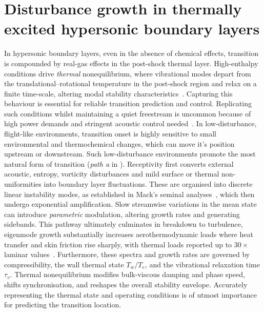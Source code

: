 \chapter{Disturbance growth in thermally excited hypersonic boundary layers}\label{chapter:disturbance_growth}

In hypersonic boundary layers, even in the absence of chemical effects,  transition is compounded by real-gas effects in the post-shock thermal layer. High-enthalpy conditions drive \emph{thermal} nonequilibrium, where vibrational modes depart from the translational--rotational temperature in the post-shock region and relax on a finite time-scale, altering modal stability characteristics~\citep{Candler2019}. Capturing this behaviour is essential for reliable transition prediction and control. Replicating such conditions whilst maintaining a quiet freestream is uncommon because of high power demands and stringent acoustic control needed~\citep{DiRenzo2021}. In low-disturbance, flight-like environments, transition onset is highly sensitive to small environmental and thermochemical changes, which can move it's position upstream or downstream. Such low-disturbance environments promote the most natural form of transition (\textit{path a} in ). Receptivity first converts external acoustic, entropy, vorticity disturbances and mild surface or thermal non-uniformities into boundary layer fluctuations. These are organised into discrete linear instability modes, as established in Mack's seminal analyses~\citep{Mack1984}, which then undergo exponential amplification. Slow streamwise variations in the mean state can introduce \emph{parametric} modulation, altering growth rates and generating sidebands. This pathway ultimately culminates in breakdown to turbulence, eigenmode growth substantially increases aerothermodynamic loads where heat transfer and skin friction rise sharply, with thermal loads reported up to $30\times$ laminar values~\citep{BitterShepherd2015}. Furthermore, these spectra and growth rates are governed by compressibility, the wall thermal state $T_w/T_e$, and the vibrational relaxation time $\tau_v$. Thermal nonequilibrium modifies bulk-viscous damping and phase speed, shifts synchronisation, and reshapes the overall stability envelope. Accurately representing the thermal state and operating conditions is of utmost importance for predicting the transition location.

